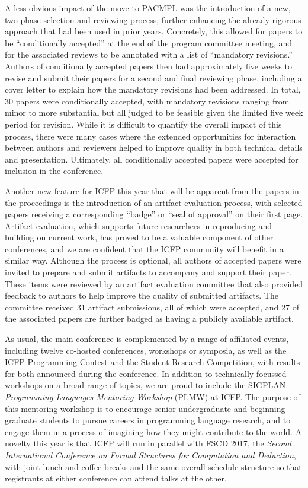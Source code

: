 A less obvious impact of the move to PACMPL was the introduction of a new, two-phase selection and reviewing process, further enhancing the already rigorous approach that had been used in prior years. Concretely, this allowed for papers to be ``conditionally accepted'' at the end of the program committee meeting, and for the associated reviews to be annotated with a list of ``mandatory revisions.''  Authors of conditionally accepted papers then had approximately five weeks to revise and submit their papers for a second and final reviewing phase, including a cover letter to explain how the mandatory revisions had been addressed. In total, 30 papers were conditionally accepted, with mandatory revisions ranging from minor to more substantial but all judged to be feasible given the limited five week period for revision. While it is difficult to quantify the overall impact of this process, there were many cases where the extended opportunities for interaction between authors and reviewers helped to improve quality in both technical details and presentation. Ultimately, all conditionally accepted papers were accepted for inclusion in the conference.

Another new feature for ICFP this year that will be apparent from the papers in the proceedings is the introduction of an artifact evaluation process, with selected papers receiving a corresponding ``badge'' or ``seal of approval'' on their first page. Artifact evaluation, which supports future researchers in reproducing and building on current work, has proved to be a valuable component of other conferences, and we are confident that the ICFP community will benefit in a similar way. Although the process is optional, all authors of accepted papers were invited to prepare and submit artifacts to accompany and support their paper. These items were reviewed by an artifact evaluation committee that also provided feedback to authors to help improve the quality of submitted artifacts. The committee received 31 artifact submissions, all of which were accepted, and 27 of the associated papers are further badged as having a publicly available artifact.

As usual, the main conference is complemented by a range of affiliated events, including twelve co-hosted conferences, workshops or symposia, as well as the ICFP Programming Contest and the Student Research Competition, with results for both announced during the conference.  In addition to technically focussed workshops on a broad range of topics, we are proud to include the SIGPLAN \textit{Programming Languages Mentoring Workshop} (PLMW) at ICFP. The purpose of this mentoring workshop is to encourage senior undergraduate and beginning graduate students to pursue careers in programming language research, and to engage them in a process of imagining how they might contribute to the world. A novelty this year is that ICFP will run in parallel with FSCD 2017, the \textit{Second International Conference on Formal Structures for Computation and Deduction}, with joint lunch and coffee breaks and the same overall schedule structure so that registrants at either conference can attend talks at the other. 

